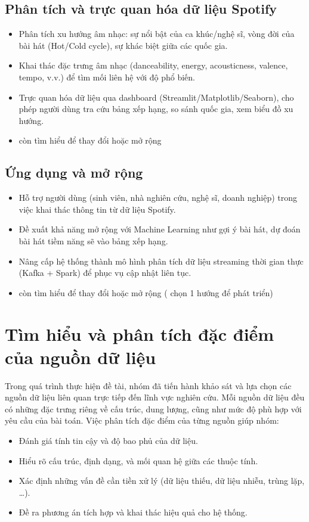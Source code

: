 \documentclass{../hcmut-report}
\begin{document}
\subsection{Phân tích và trực quan hóa dữ liệu Spotify}
\begin{itemize}
    \item Phân tích xu hướng âm nhạc: sự nổi bật của ca khúc/nghệ sĩ, vòng đời của bài hát (Hot/Cold cycle), sự khác biệt giữa các quốc gia.
    \item Khai thác đặc trưng âm nhạc (danceability, energy, acousticness, valence, tempo, v.v.) để tìm mối liên hệ với độ phổ biến.
    \item Trực quan hóa dữ liệu qua dashboard (Streamlit/Matplotlib/Seaborn), cho phép người dùng tra cứu bảng xếp hạng, so sánh quốc gia, xem biểu đồ xu hướng.
    \item còn tìm hiểu để thay đổi hoặc mở rộng
\end{itemize}

\subsection{Ứng dụng và mở rộng}
\begin{itemize}
    \item Hỗ trợ người dùng (sinh viên, nhà nghiên cứu, nghệ sĩ, doanh nghiệp) trong việc khai thác thông tin từ dữ liệu Spotify.
    \item Đề xuất khả năng mở rộng với Machine Learning như gợi ý bài hát, dự đoán bài hát tiềm năng sẽ vào bảng xếp hạng.
    \item Nâng cấp hệ thống thành mô hình phân tích dữ liệu streaming thời gian thực (Kafka + Spark) để phục vụ cập nhật liên tục.
    \item còn tìm hiểu để thay đổi hoặc mở rộng ( chọn 1 hướng để phát triển)
\end{itemize}






\section{Tìm hiểu và phân tích đặc điểm của nguồn dữ liệu}
Trong quá trình thực hiện đề tài, nhóm đã tiến hành khảo sát và lựa chọn các nguồn dữ liệu 
liên quan trực tiếp đến lĩnh vực nghiên cứu. 
Mỗi nguồn dữ liệu đều có những đặc trưng riêng về cấu trúc, dung lượng, cũng như mức độ phù hợp 
với yêu cầu của bài toán. 
Việc phân tích đặc điểm của từng nguồn giúp nhóm:
\begin{itemize}
    \item Đánh giá tính tin cậy và độ bao phủ của dữ liệu.
    \item Hiểu rõ cấu trúc, định dạng, và mối quan hệ giữa các thuộc tính.
    \item Xác định những vấn đề cần tiền xử lý (dữ liệu thiếu, dữ liệu nhiễu, trùng lặp, …).
    \item Đề ra phương án tích hợp và khai thác hiệu quả cho hệ thống.
\end{itemize}
\end{document}
